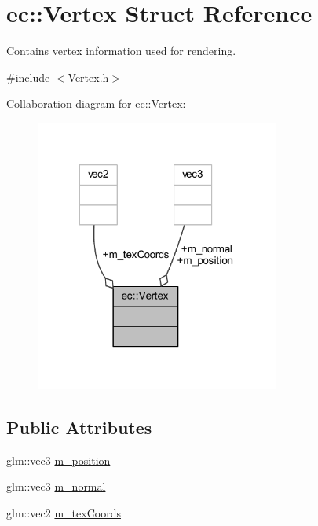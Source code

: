 \hypertarget{structec_1_1_vertex}{}\section{ec\+:\+:Vertex Struct Reference}
\label{structec_1_1_vertex}


Contains vertex information used for rendering.  




{\ttfamily \#include $<$Vertex.\+h$>$}



Collaboration diagram for ec\+:\+:Vertex\+:\nopagebreak
\begin{figure}[H]
\begin{center}
\leavevmode
\includegraphics[width=227pt]{structec_1_1_vertex__coll__graph}
\end{center}
\end{figure}
\subsection*{Public Attributes}
\begin{DoxyCompactItemize}
\item 
glm\+::vec3 \mbox{\hyperlink{structec_1_1_vertex_acb3327c996406e4d1a6b43cfa1f3ea47}{m\+\_\+position}}
\item 
glm\+::vec3 \mbox{\hyperlink{structec_1_1_vertex_aec5eb9b7fc72c250525c6b64bfabd2a2}{m\+\_\+normal}}
\item 
glm\+::vec2 \mbox{\hyperlink{structec_1_1_vertex_a12e2b45d0fdb3873a01dd9ada9e66f64}{m\+\_\+tex\+Coords}}
\end{DoxyCompactItemize}


